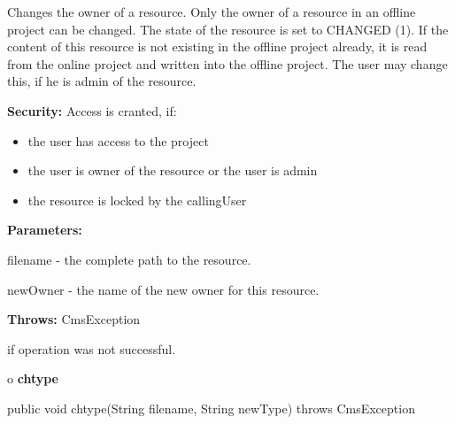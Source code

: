\begin{description}
\htmlDD Changes the owner of a resource. \htmlBR
Only the owner of a resource in an offline project can be changed. The state
of the resource is set to CHANGED (1). If the content of this resource is not
existing in the offline project already, it is read from the online project
and written into the offline project. The user may change this, if he is admin
of the resource.

{\bf Security:} Access is cranted, if:

\begin{itemize}
\item the user has access to the project
\item the user is owner of the resource or the user is admin
\item the resource is locked by the callingUser
\end{itemize}

\begin{description}
\item {\bf Parameters:}

filename - the complete path to the resource.

newOwner - the name of the new owner for this resource.
\item {\bf Throws:} CmsException

if operation was not successful.
\end{description}

\end{description}

o {\bf chtype}

\begin{PRE}
 public void chtype(String filename,
                    String newType) throws CmsException
\end{PRE}

